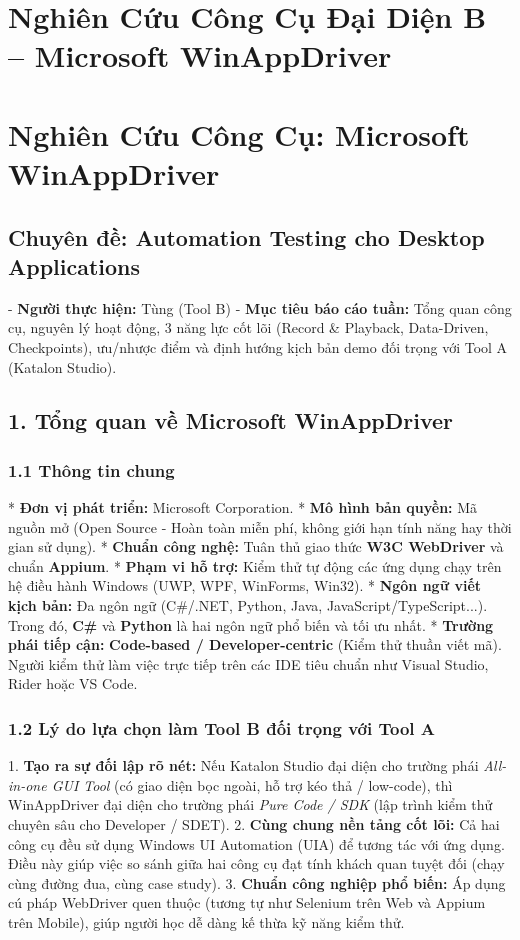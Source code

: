 \section{Nghiên Cứu Công Cụ Đại Diện B – Microsoft WinAppDriver}

\section{Nghiên Cứu Công Cụ: Microsoft WinAppDriver}
\subsection{Chuyên đề: Automation Testing cho Desktop Applications}

- \textbf{Người thực hiện:} Tùng (Tool B)
- \textbf{Mục tiêu báo cáo tuần:} Tổng quan công cụ, nguyên lý hoạt động, 3 năng lực cốt lõi (Record & Playback, Data-Driven, Checkpoints), ưu/nhược điểm và định hướng kịch bản demo đối trọng với Tool A (Katalon Studio).


\subsection{1. Tổng quan về Microsoft WinAppDriver}

\subsubsection{1.1 Thông tin chung}
* \textbf{Đơn vị phát triển:} Microsoft Corporation.
* \textbf{Mô hình bản quyền:} Mã nguồn mở (Open Source - Hoàn toàn miễn phí, không giới hạn tính năng hay thời gian sử dụng).
* \textbf{Chuẩn công nghệ:} Tuân thủ giao thức \textbf{W3C WebDriver} và chuẩn \textbf{Appium}.
* \textbf{Phạm vi hỗ trợ:} Kiểm thử tự động các ứng dụng chạy trên hệ điều hành Windows (UWP, WPF, WinForms, Win32).
* \textbf{Ngôn ngữ viết kịch bản:} Đa ngôn ngữ (C#/.NET, Python, Java, JavaScript/TypeScript...). Trong đó, \textbf{C#} và \textbf{Python} là hai ngôn ngữ phổ biến và tối ưu nhất.
* \textbf{Trường phái tiếp cận:} \textbf{Code-based / Developer-centric} (Kiểm thử thuần viết mã). Người kiểm thử làm việc trực tiếp trên các IDE tiêu chuẩn như Visual Studio, Rider hoặc VS Code.

\subsubsection{1.2 Lý do lựa chọn làm Tool B đối trọng với Tool A}
1. \textbf{Tạo ra sự đối lập rõ nét:} Nếu Katalon Studio đại diện cho trường phái \textit{All-in-one GUI Tool} (có giao diện bọc ngoài, hỗ trợ kéo thả / low-code), thì WinAppDriver đại diện cho trường phái \textit{Pure Code / SDK} (lập trình kiểm thử chuyên sâu cho Developer / SDET).
2. \textbf{Cùng chung nền tảng cốt lõi:} Cả hai công cụ đều sử dụng Windows UI Automation (UIA) để tương tác với ứng dụng. Điều này giúp việc so sánh giữa hai công cụ đạt tính khách quan tuyệt đối (chạy cùng đường đua, cùng case study).
3. \textbf{Chuẩn công nghiệp phổ biến:} Áp dụng cú pháp WebDriver quen thuộc (tương tự như Selenium trên Web và Appium trên Mobile), giúp người học dễ dàng kế thừa kỹ năng kiểm thử.


